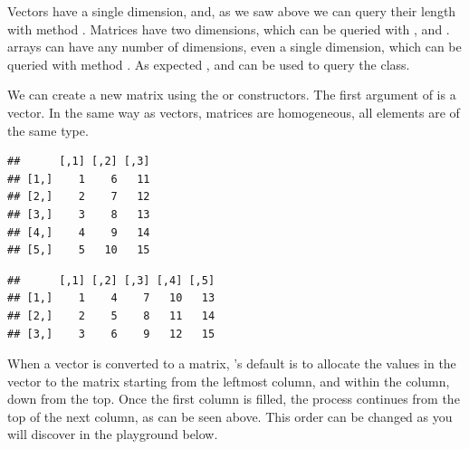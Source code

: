 \documentclass[krantz2]{krantz}\usepackage{knitr}%
\begin{document}
Vectors have a single dimension, and, as we saw above we can query their length with method . Matrices have two dimensions, which can be queried with ,  and . \Rlang arrays can have any number of dimensions, even a single dimension, which can be queried with method . As expected ,  and  can be used to query the class.

We can create a new matrix using the  or  constructors. The first argument of  is a vector. In the same way as vectors, matrices are homogeneous, all elements are of the same type.

\begin{knitrout}\footnotesize
{}\color{fgcolor}\begin{kframe}
\begin{alltt}
\hlstd{(}\hlopt{:}\hlstd{,}  \hlstd{=} \hlstd{)}
\end{alltt}
\begin{verbatim}
##      [,1] [,2] [,3]
## [1,]    1    6   11
## [2,]    2    7   12
## [3,]    3    8   13
## [4,]    4    9   14
## [5,]    5   10   15
\end{verbatim}
\begin{alltt}
\hlstd{(}\hlopt{:}\hlstd{,}  \hlstd{=} \hlstd{)}
\end{alltt}
\begin{verbatim}
##      [,1] [,2] [,3] [,4] [,5]
## [1,]    1    4    7   10   13
## [2,]    2    5    8   11   14
## [3,]    3    6    9   12   15
\end{verbatim}
\end{kframe}
\end{knitrout}

When a vector is converted to a matrix, \Rlang's default is to allocate the values in the vector to the matrix starting from the leftmost column, and within the column, down from the top. Once the first column is filled, the process continues from the top of the next column, as can be seen above. This order can be changed as you will discover in the playground below.
\end{document}

